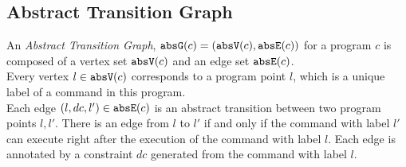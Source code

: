 \subsection{Abstract Transition Graph}
\label{sec:abs_prog}
An \emph{Abstract Transition Graph}, $\mathtt{abs}{\mathtt{G}}(c) =(\mathtt{abs}{\mathtt{V}}(c), \mathtt{abs}{\mathtt{E}}(c))$ for a program $c$ is composed of
a vertex set $\mathtt{abs}{\mathtt{V}}(c)$ and an edge set $\mathtt{abs}{\mathtt{E}}(c)$.
%
\\
Every 
vertex $l \in \mathtt{abs}{\mathtt{V}}(c)$ corresponds to a program point $l$, which is a unique
label of a command in this program.
\\
Each edge $(l, dc, l') \in \mathtt{abs}{\mathtt{E}}(c)$ is an abstract transition
between two program points $l, l'$. There is an edge from $l$ to $l'$ if and only if
the command with label $l'$ can execute right after the execution of the command with label $l$.
Each edge is annotated by a constraint $dc$ generated from the command with label $l$.
